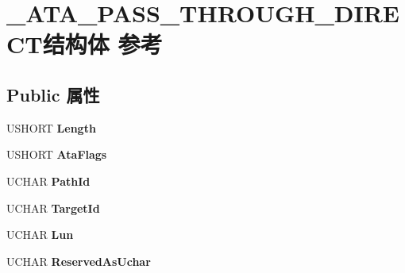 \hypertarget{struct___a_t_a___p_a_s_s___t_h_r_o_u_g_h___d_i_r_e_c_t}{}\section{\+\_\+\+A\+T\+A\+\_\+\+P\+A\+S\+S\+\_\+\+T\+H\+R\+O\+U\+G\+H\+\_\+\+D\+I\+R\+E\+C\+T结构体 参考}
\label{struct___a_t_a___p_a_s_s___t_h_r_o_u_g_h___d_i_r_e_c_t}
\subsection*{Public 属性}
\begin{DoxyCompactItemize}
\item 
\mbox{\label{struct___a_t_a___p_a_s_s___t_h_r_o_u_g_h___d_i_r_e_c_t_ac585d6831bc868ecb3ba435d834c3f06}} 
U\+S\+H\+O\+RT {\bfseries Length}
\item 
\mbox{\label{struct___a_t_a___p_a_s_s___t_h_r_o_u_g_h___d_i_r_e_c_t_a0ee8890e4f7cab74b9d7dd917a0f6328}} 
U\+S\+H\+O\+RT {\bfseries Ata\+Flags}
\item 
\mbox{\label{struct___a_t_a___p_a_s_s___t_h_r_o_u_g_h___d_i_r_e_c_t_ae49cef64e1b1ce3e9cc7b460305609c0}} 
U\+C\+H\+AR {\bfseries Path\+Id}
\item 
\mbox{\label{struct___a_t_a___p_a_s_s___t_h_r_o_u_g_h___d_i_r_e_c_t_a0eb04ca213e361c414967bf2e15412f3}} 
U\+C\+H\+AR {\bfseries Target\+Id}
\item 
\mbox{\label{struct___a_t_a___p_a_s_s___t_h_r_o_u_g_h___d_i_r_e_c_t_aa51939dd5a42daf4233314689770a985}} 
U\+C\+H\+AR {\bfseries Lun}
\item 
\mbox{\label{struct___a_t_a___p_a_s_s___t_h_r_o_u_g_h___d_i_r_e_c_t_a38d0196b5a8d5651b7bc0a128adb812d}} 
U\+C\+H\+AR {\bfseries Reserved\+As\+Uchar}
\item 

\end{DoxyCompactItemize}
